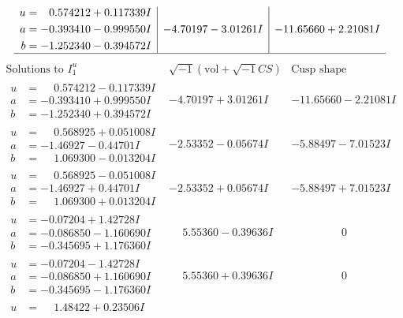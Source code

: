 \documentclass[1p]{elsarticle_modified}
\theoremstyle{definition}
\newcommand{\I}{\sqrt{-1}}
\begin{document}
$$\begin{array}{c|c|c}
\begin{aligned}
u &= \phantom{-}0.574212 + 0.117339 I \\
a &= -0.393410 - 0.999550 I \\
b &= -1.252340 - 0.394572 I\end{aligned}
 & -4.70197 - 3.01261 I & -11.65660 + 2.21081 I\\
 \hline 
 \end{array}$$\newpage$$\begin{array}{c|c|c}  
\text{Solutions to }I^u_{1}& \I (\text{vol} + \sqrt{-1}CS) & \text{Cusp shape}\\
 \hline 
\begin{aligned}
u &= \phantom{-}0.574212 - 0.117339 I \\
a &= -0.393410 + 0.999550 I \\
b &= -1.252340 + 0.394572 I\end{aligned}
 & -4.70197 + 3.01261 I & -11.65660 - 2.21081 I \\ \hline\begin{aligned}
u &= \phantom{-}0.568925 + 0.051008 I \\
a &= -1.46927 - 0.44701 I \\
b &= \phantom{-}1.069300 - 0.013204 I\end{aligned}
 & -2.53352 - 0.05674 I & -5.88497 - 7.01523 I \\ \hline\begin{aligned}
u &= \phantom{-}0.568925 - 0.051008 I \\
a &= -1.46927 + 0.44701 I \\
b &= \phantom{-}1.069300 + 0.013204 I\end{aligned}
 & -2.53352 + 0.05674 I & -5.88497 + 7.01523 I \\ \hline\begin{aligned}
u &= -0.07204 + 1.42728 I \\
a &= -0.086850 - 1.160690 I \\
b &= -0.345695 + 1.176360 I\end{aligned}
 & \phantom{-}5.55360 - 0.39636 I & \phantom{-0.000000 } 0 \\ \hline\begin{aligned}
u &= -0.07204 - 1.42728 I \\
a &= -0.086850 + 1.160690 I \\
b &= -0.345695 - 1.176360 I\end{aligned}
 & \phantom{-}5.55360 + 0.39636 I & \phantom{-0.000000 } 0 \\ \hline\begin{aligned}
u &= \phantom{-}1.48422 + 0.23506 I \\

\end{aligned}
\end{array}$$
\end{document}
